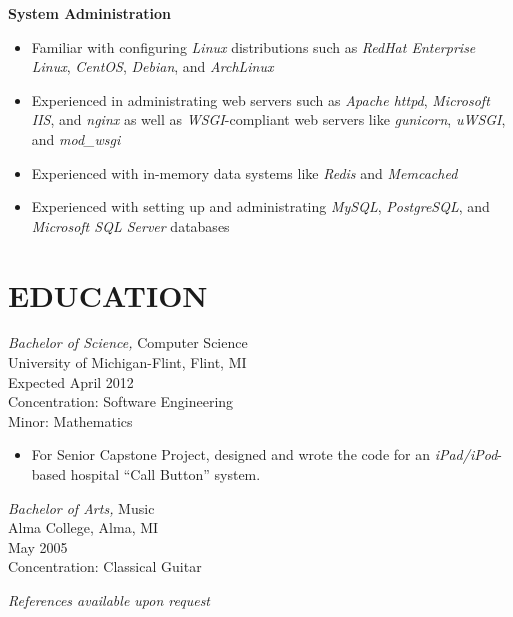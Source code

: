 \documentclass[line,margin]{res}
\begin{document}
\begin{resume}
    \textbf{System Administration} \vspace{2 mm}
    \begin{itemize}
        \item Familiar with configuring {\sl Linux} distributions such as {\sl RedHat
              Enterprise Linux}, {\sl CentOS}, {\sl Debian}, and {\sl ArchLinux}
        \item Experienced in administrating web servers such as {\sl Apache httpd},
              {\sl Microsoft IIS}, and {\sl nginx} as well as
              {\sl WSGI}-compliant web servers like {\sl gunicorn},
              {\sl uWSGI}, and {\sl mod\_wsgi}
        \item Experienced with in-memory data systems like {\sl Redis} and {\sl Memcached}
        \item Experienced with setting up and administrating {\sl MySQL},
              {\sl PostgreSQL}, and {\sl Microsoft SQL Server} databases
    \end{itemize}



\section{EDUCATION} 
                {\sl Bachelor of Science,} Computer Science \\
                University of Michigan-Flint, Flint, MI \\
                Expected April 2012 \\
                Concentration: Software Engineering \\
                Minor: Mathematics
                \vspace{2 mm}
                \begin{itemize}
                    \item For Senior Capstone Project, designed and wrote 
                            the code for an {\sl iPad/iPod}-based hospital
                            ``Call Button'' system.
                \end{itemize}

                {\sl Bachelor of Arts,} Music \\
                Alma College, Alma, MI \\
                May 2005 \\
                Concentration: Classical Guitar

\vspace{30 mm}


\end{resume}

\begin{flushleft}
{\sl References available upon request}
\end{flushleft}
\end{document}
